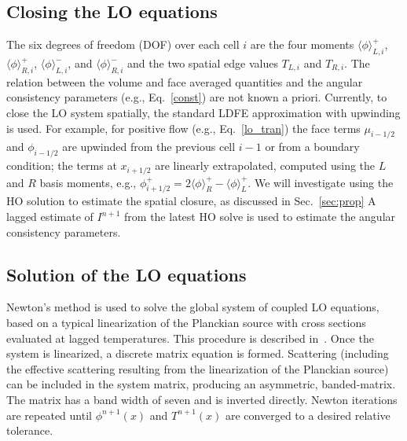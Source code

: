 \documentclass[11pt]{article}
\newcommand{\mom}[1]{\langle #1 \rangle}
\begin{document}
\subsection{Closing the LO equations}

The six degrees of freedom (DOF) over each cell $i$ are the four moments $\mom{\phi}_{L,i}^+$,
$\mom{\phi}_{R,i}^+$, $\mom{\phi}_{L,i}^-$, and $\mom{\phi}_{R,i}^-$ and the two
spatial edge values $T_{L,i}$ and $T_{R,i}$. The relation between the volume and face averaged quantities and the angular consistency parameters (e.g., Eq.~\eqref{const}) are not known a priori. 
Currently, to close the LO system spatially, the standard LDFE approximation with upwinding is
used.  For example, for positive flow (e.g., Eq.~\eqref{lo_tran}) the face terms $\mu_{i-1/2}$ and $\phi_{i-1/2}$
are upwinded from the previous cell $i-1$ or from a boundary condition; the terms
at $x_{i+1/2}$ are linearly extrapolated, computed using the $L$ and $R$ basis
moments, e.g., $\phi^+_{i+1/2} = 2\mom{\phi}_R^+ - \mom{\phi}_L^+$. We will investigate
using the HO solution to estimate the spatial closure, as discussed in Sec.~\ref{sec:prop}
A lagged estimate of $I^{n+1}$ from the latest HO solve is
used to estimate the angular consistency parameters. 

\subsection{Solution of the LO equations}
\label{sec:lo_sol}

Newton's method is used to solve the global system of coupled LO
equations, based on a typical linearization of the Planckian source with cross
sections evaluated at lagged temperatures.  This procedure is described
in~\cite{morel_newton}. 
Once the system is linearized, a discrete matrix equation is formed.  Scattering
(including the effective scattering resulting from the linearization of the
Planckian source) can
be included in the system matrix, producing an asymmetric, banded-matrix.  The matrix
has a band width of seven and is inverted directly.
Newton iterations are repeated until $\phi^{n+1}(x)$ and $T^{n+1}(x)$ are converged
to a desired relative tolerance. 
\end{document}
